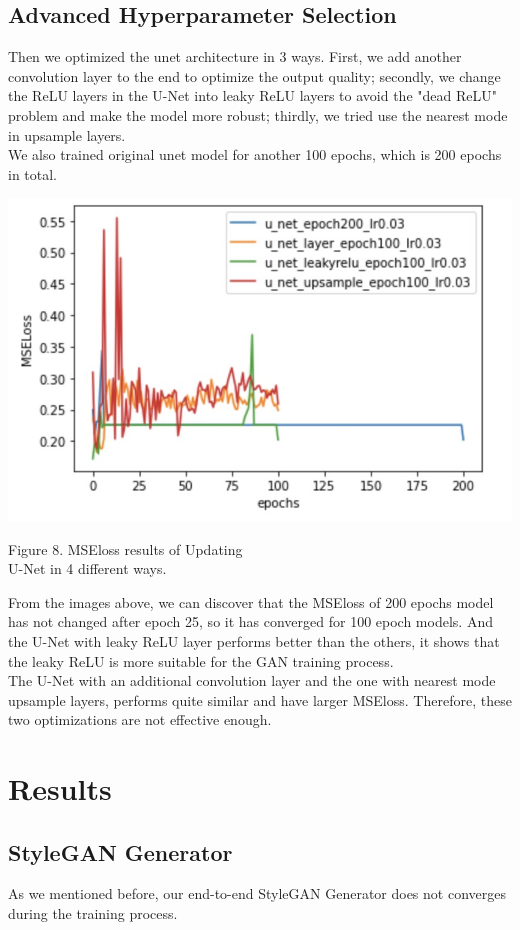 \documentclass[letterpaper]{article}
\begin{document}
\subsection{Advanced Hyperparameter Selection}
Then we optimized the unet architecture in 3 ways. First, we add another convolution layer to the end to optimize the output quality; secondly, we change the ReLU layers in the U-Net into leaky ReLU layers to avoid the "dead ReLU" problem and make the model more robust; thirdly, we tried use the nearest mode in upsample layers.
\\
We also trained original unet model for another 100 epochs, which is 200 epochs in total.

\begin{center}
    \includegraphics[width=.5\textwidth]{./report-fig-hp-2.jpeg}

    Figure 8. MSEloss results of Updating\\U-Net in 4 different ways.
\end{center}

From the images above, we can discover that the MSEloss of 200 epochs model has not changed after epoch 25, so it has converged for 100 epoch models. And the U-Net with leaky ReLU layer performs better than the others, it shows that the leaky ReLU is more suitable for the GAN training process.
\\
The U-Net with an additional convolution layer and the one with nearest mode upsample layers, performs quite similar and have larger MSEloss. Therefore, these two optimizations are not effective enough.

\section{Results}
\subsection{StyleGAN Generator}
As we mentioned before, our end-to-end StyleGAN Generator does not converges during the training process.
\end{document}
